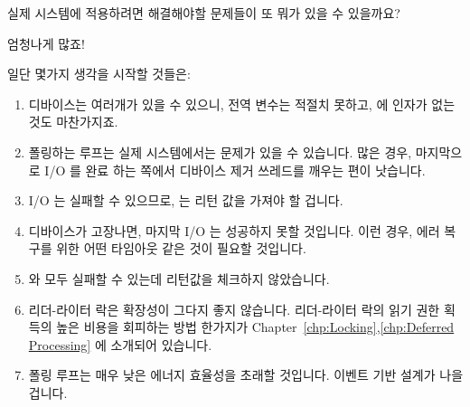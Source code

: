 \begin{enumerate}
\QuickQ{}
	실제 시스템에 적용하려면 해결해야할 문제들이 또 뭐가 있을 수 있을까요?

\QuickA{}
	엄청나게 많죠!

	일단 몇가지 생각을 시작할 것들은:

	\begin{enumerate}
	\item	디바이스는 여러개가 있을 수 있으니, 전역 변수는 적절치 못하고,
		  에 인자가 없는 것도 마찬가지죠.
	\item	폴링하는 루프는 실제 시스템에서는 문제가 있을 수 있습니다.
		많은 경우, 마지막으로 I/O 를 완료 하는 쪽에서 디바이스 제거
		쓰레드를 깨우는 편이 낫습니다.
	\item	I/O 는 실패할 수 있으므로,  는 리턴 값을 가져야 할
		겁니다.
	\item	디바이스가 고장나면, 마지막 I/O 는 성공하지 못할 것입니다.
		이런 경우, 에러 복구를 위한 어떤 타임아웃 같은 것이 필요할
		것입니다.
	\item	{} 와  모두 실패할 수 있는데
		리턴값을 체크하지 않았습니다.
	\item	리더-라이터 락은 확장성이 그다지 좋지 않습니다.
		리더-라이터 락의 읽기 권한 획득의 높은 비용을 회피하는 방법
		한가지가 Chapter~\ref{chp:Locking},\ref{chp:Deferred
		Processing} 에 소개되어 있습니다.
	\item	폴링 루프는 매우 낮은 에너지 효율성을 초래할 것입니다.
		이벤트 기반 설계가 나을 겁니다.
	\end{enumerate}

\end{enumerate}
